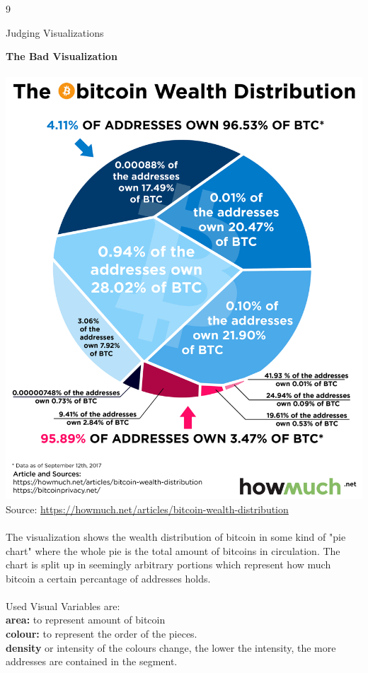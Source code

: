 \documentclass{article}
\begin{document}
\begin{ukon-infie}[17.01.18]{9}
\begin{exercise}[p=8]{Judging Visualizations}
		
		\textbf{The Bad Visualization}\\\\
		\includegraphics[scale=0.2]{bad_example.png}\\
		Source: \url{https://howmuch.net/articles/bitcoin-wealth-distribution}\\\\
		The visualization shows the wealth distribution of bitcoin in some kind of "pie chart" where the whole pie is the total amount of bitcoins in circulation. The chart is split up in seemingly arbitrary portions which represent how much bitcoin a certain percantage of addresses holds. \\\\
		\newpage
		Used Visual Variables are:\\
		\textbf{area:} to represent amount of bitcoin\\
		\textbf{colour:} to represent the order of the pieces.\\
		\textbf{density} or intensity of the colours change, the lower the intensity, the more addresses are contained in the segment.\\\\

\end{exercise}
\end{ukon-infie}
\end{document}
